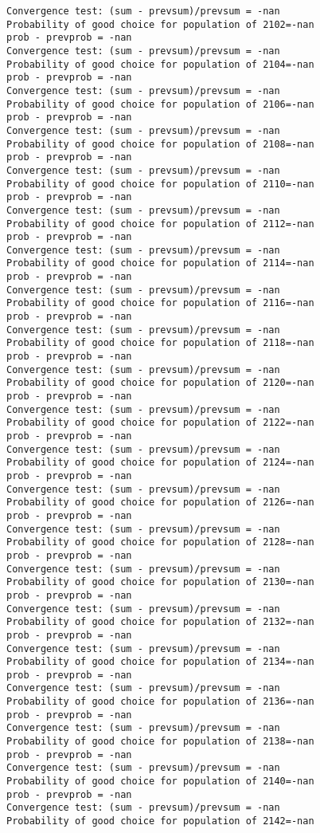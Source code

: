 \documentclass[11pt,onecolumn]{article}
\begin{document}
\begin{verbatim}
Convergence test: (sum - prevsum)/prevsum = -nan
Probability of good choice for population of 2102=-nan
prob - prevprob = -nan
Convergence test: (sum - prevsum)/prevsum = -nan
Probability of good choice for population of 2104=-nan
prob - prevprob = -nan
Convergence test: (sum - prevsum)/prevsum = -nan
Probability of good choice for population of 2106=-nan
prob - prevprob = -nan
Convergence test: (sum - prevsum)/prevsum = -nan
Probability of good choice for population of 2108=-nan
prob - prevprob = -nan
Convergence test: (sum - prevsum)/prevsum = -nan
Probability of good choice for population of 2110=-nan
prob - prevprob = -nan
Convergence test: (sum - prevsum)/prevsum = -nan
Probability of good choice for population of 2112=-nan
prob - prevprob = -nan
Convergence test: (sum - prevsum)/prevsum = -nan
Probability of good choice for population of 2114=-nan
prob - prevprob = -nan
Convergence test: (sum - prevsum)/prevsum = -nan
Probability of good choice for population of 2116=-nan
prob - prevprob = -nan
Convergence test: (sum - prevsum)/prevsum = -nan
Probability of good choice for population of 2118=-nan
prob - prevprob = -nan
Convergence test: (sum - prevsum)/prevsum = -nan
Probability of good choice for population of 2120=-nan
prob - prevprob = -nan
Convergence test: (sum - prevsum)/prevsum = -nan
Probability of good choice for population of 2122=-nan
prob - prevprob = -nan
Convergence test: (sum - prevsum)/prevsum = -nan
Probability of good choice for population of 2124=-nan
prob - prevprob = -nan
Convergence test: (sum - prevsum)/prevsum = -nan
Probability of good choice for population of 2126=-nan
prob - prevprob = -nan
Convergence test: (sum - prevsum)/prevsum = -nan
Probability of good choice for population of 2128=-nan
prob - prevprob = -nan
Convergence test: (sum - prevsum)/prevsum = -nan
Probability of good choice for population of 2130=-nan
prob - prevprob = -nan
Convergence test: (sum - prevsum)/prevsum = -nan
Probability of good choice for population of 2132=-nan
prob - prevprob = -nan
Convergence test: (sum - prevsum)/prevsum = -nan
Probability of good choice for population of 2134=-nan
prob - prevprob = -nan
Convergence test: (sum - prevsum)/prevsum = -nan
Probability of good choice for population of 2136=-nan
prob - prevprob = -nan
Convergence test: (sum - prevsum)/prevsum = -nan
Probability of good choice for population of 2138=-nan
prob - prevprob = -nan
Convergence test: (sum - prevsum)/prevsum = -nan
Probability of good choice for population of 2140=-nan
prob - prevprob = -nan
Convergence test: (sum - prevsum)/prevsum = -nan
Probability of good choice for population of 2142=-nan

\end{verbatim}
\end{document}
